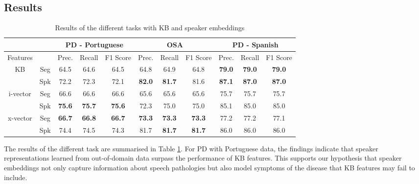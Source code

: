 \subsection{Results}
\begin{table}[h]
  \begin{tabular}{cc|ccc|ccc|ccc} \hline
                            &     & \multicolumn{3}{c|}{PD - Portuguese} & \multicolumn{3}{c|}{OSA}                      & \multicolumn{3}{c}{PD - Spanish} \\ \hline
  Features                  &     & Prec.        & Recall           & F1 Score        & Prec.     & Recall        & F1 Score      & Prec.       & Recall         & F1 Score       \\ \hline
  \multirow{2}{*}{KB}       & Seg & 64.5             & 64.6             & 64.5            & 64.8          & 64.9          & 64.8          & \textbf{79.0}   & \textbf{79.0}  & \textbf{79.0}  \\
                            & Spk & 72.2             & 72.3             & 72.1            & \textbf{82.0} & \textbf{81.7} & 81.6          & \textbf{87.1}   & \textbf{87.0}  & \textbf{87.0}  \\ \hline
  \multirow{2}{*}{i-vector} & Seg & 66.6             & 66.6             & 66.6            & 65.6          & 65.6          & 65.6          & 75.7            & 75.7           & 75.7           \\
                            & Spk & \textbf{75.6}    & \textbf{75.7}    & \textbf{75.6}   & 72.3          & 75.0          & 75.0          & 85.1            & 85.0           & 85.0           \\ \hline
  \multirow{2}{*}{x-vector} & Seg & \textbf{66.7}    & \textbf{66.8}    & \textbf{66.7}   & \textbf{73.3} & \textbf{73.3} & \textbf{73.3} & 77.2            & 77.2           & 77.1           \\
                            & Spk & 74.4             & 74.5             & 74.3            & 81.7          & \textbf{81.7} & \textbf{81.7} & 86.0            & 86.0           & 86.0 \\ \hline    
  \end{tabular}
  \caption{Results of the different tasks with KB and speaker embeddings}
  \label{tab:xvect_results}
  \end{table}
The results of the different task are summarised in Table \ref{tab:xvect_results}. For PD with Portuguese data, the findings indicate that speaker representations learned from out-of-domain data surpass the performance of KB features. This supports our hypothesis that speaker embeddings not only capture information about speech pathologies but also model symptoms of the disease that KB features may fail to include.

